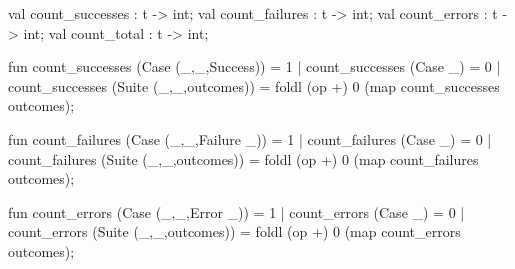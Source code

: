 \nwenddocs{}\plusendmoddef\nwstartdeflinemarkup{}\nwenddeflinemarkup
val count_successes : t -> int;
val count_failures : t -> int;
val count_errors : t -> int;
val count_total : t -> int;
\nwendcode{}\nwdocspar

\nwenddocs{}\plusendmoddef\nwstartdeflinemarkup{}\nwenddeflinemarkup
fun count_successes (Case (_,_,Success)) = 1
  | count_successes (Case _) = 0 
  | count_successes (Suite (_,_,outcomes)) =
      foldl (op +) 0 (map count_successes outcomes);

fun count_failures (Case (_,_,Failure _)) = 1
  | count_failures (Case _) = 0
  | count_failures (Suite (_,_,outcomes)) =
      foldl (op +) 0 (map count_failures outcomes);

fun count_errors (Case (_,_,Error _)) = 1
  | count_errors (Case _) = 0
  | count_errors (Suite (_,_,outcomes)) =
      foldl (op +) 0 (map count_errors outcomes);

